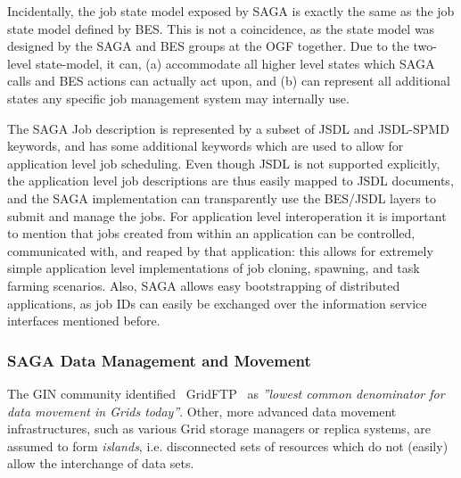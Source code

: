 \documentclass[conference,final]{IEEEtran}
\newcommand{\I}{\textit}
\newcommand{\jhanote}[1]{ {\textcolor{red} { ***Jha: #1 }}}
\begin{document}
Incidentally, the job state model exposed by SAGA is exactly the same
as the job state model defined by BES.  This is not a coincidence, as
the state model was designed by the SAGA and BES groups at the OGF
together. Due to the two-level state-model, it can, (a)
accommodate all higher level states which SAGA calls and BES actions
can actually act upon, and (b) can represent all additional states any
specific job management system may internally use.

The SAGA Job description is represented by a subset of JSDL and
JSDL-SPMD keywords, and has some additional keywords which are used to
allow for application level job scheduling.  Even though JSDL is not
supported explicitly, the application level job descriptions are thus
easily mapped to JSDL documents, and the SAGA implementation can
transparently use the BES/JSDL layers to submit and manage the jobs.
For application level interoperation it is important to mention that
jobs created from within an application can be controlled,
communicated with, and reaped by that application: this allows for
extremely simple application level implementations of job cloning,
spawning, and task farming scenarios.  Also, SAGA allows easy
bootstrapping of distributed applications, as job IDs can easily be
exchanged over the information service interfaces mentioned before.

\subsubsection{SAGA Data Management and Movement}



The GIN community identified~\cite{gin_paper} GridFTP~\cite{gridftp}
as \I{''lowest common denominator for data movement in Grids today''}.
Other, more advanced data movement infrastructures, such as various
Grid storage managers or replica systems, are assumed to form
\I{islands}, i.e. disconnected sets of resources which do not (easily)
allow the interchange of data sets.
\end{document}
